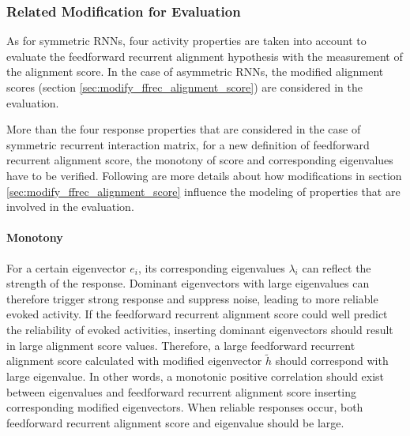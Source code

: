 \documentclass[11pt]{article}
\begin{document}
{	\subsubsection{Related Modification for Evaluation} \label{sec:modification_asym}
	As for symmetric RNNs, four activity properties are taken into account to evaluate the feedforward recurrent alignment hypothesis with the measurement of the alignment score. In the case of asymmetric RNNs, the modified alignment scores (section \ref{sec:modify_ffrec_alignment_score}) are considered in the evaluation. 
	
	More than the four response properties that are considered in the case of symmetric recurrent interaction matrix, for a new definition of feedforward recurrent alignment score, the monotony of score and corresponding eigenvalues have to be verified. Following are more details about how modifications in section \ref{sec:modify_ffrec_alignment_score} influence the modeling of properties that are involved in the evaluation. 
	
	\paragraph{Monotony} For a certain eigenvector $e_i$, its corresponding eigenvalues $\lambda_i$ can reflect the strength of the response. %
	Dominant eigenvectors with large eigenvalues can therefore trigger strong response and suppress noise, leading to more reliable evoked activity. If the feedforward recurrent alignment score could well predict the reliability of evoked activities, inserting dominant eigenvectors should result in large alignment score values. Therefore, a large feedforward recurrent alignment score calculated with modified eigenvector $\tilde{h}$ should correspond with large eigenvalue. In other words, a monotonic positive correlation should exist between eigenvalues and feedforward recurrent alignment score inserting corresponding modified eigenvectors. When reliable responses occur, both feedforward recurrent alignment score and eigenvalue should be large.  
	
}
\end{document}
